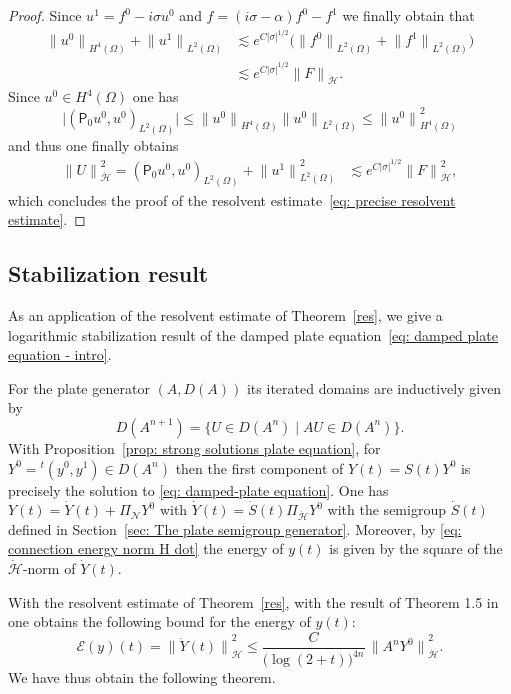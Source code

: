 \documentclass[10pt]{amsart}
\let\sep\mid
\theoremstyle{plain}
\theoremstyle{definition}
\newcommand{\inp}[2]{(#1, #2)}
\renewcommand{\H}{{\mathcal H}}
\newcommand{\E}{\ensuremath{\mathcal E}}
\newcommand{\transp}{\ensuremath{\phantom{}^{t}}}
\newcommand{\Norm}[2]{{\| #1 \|}_{#2}}
\newcommand{\Pell}{\mathsf P_0}
\begin{document}
\begin{proof}
Since $u^1=f^0-i\sigma u^0$ and $f=(i\sigma-\alpha)f^0-f^1$ we finally obtain that
\begin{align*}
\Norm{u^0}{H^4(\Omega)}
+\Norm{u^1}{L^2(\Omega)}
&\lesssim e^{C|\sigma|^{1/2}}
\big(\Norm{f^0}{L^2(\Omega)}+\Norm{f^1}{L^2(\Omega)}\big) \\
&\lesssim e^{C|\sigma|^{1/2}} \Norm{F}{\dot \H}.
\end{align*}
Since $u^0 \in H^4(\Omega)$ one has
\begin{equation*}
\big|\inp{\Pell u^0}{u^0}_{L^2(\Omega)}\big|
\leq \Norm{u^0}{H^4(\Omega)}\Norm{u^0}{L^2(\Omega)}
\leq \Norm{u^0}{H^4(\Omega)}^2
\end{equation*}
and thus one finally obtains
\begin{align*}
\Norm{U}{\dot \H}^2 = \inp{\Pell u^0}{u^0}_{L^2(\Omega)}
+\Norm{u^1}{L^2(\Omega)}^2
&\lesssim e^{C|\sigma|^{1/2}} \Norm{F}{\dot \H}^2,
\end{align*}
which concludes the proof of the resolvent estimate~\eqref{eq: precise resolvent estimate}.
\end{proof}

\subsection{Stabilization result}
\label{sec: Stabilization result}
As an application of the resolvent estimate of
Theorem~\ref{res}, we give a logarithmic stabilization result of the damped
plate equation~\eqref{eq: damped plate equation - intro}.

For the plate generator $(A,D(A))$ its iterated domains are
inductively given by
\begin{equation*}
D(A^{n+1}) = \{ U \in D(A^n)\sep A U \in D(A^n)\}.
\end{equation*}
With Proposition~\ref{prop: strong solutions plate equation}, for $Y^0 =\transp(y^0,y^1) \in D(A^n)$ then the first
component of $Y(t) = S(t) Y^0$ is precisely the solution to \eqref{eq:
damped-plate equation}.
One has $Y(t) = \dot{Y}(t) + \Pi_{\mathcal N} Y^0$ with $\dot{Y}(t)
=\dot{S}(t) \Pi_{\dot{\H}} Y^0$ with the semigroup $\dot{S}(t)$
defined in Section~\ref{sec: The plate semigroup generator}. Moreover,
by \eqref{eq: connection energy norm H dot} the energy of $y(t)$ is
given by the square of the $\dot{\H}$-norm of $\dot{Y}(t)$.

With the resolvent estimate of Theorem~\ref{res}, with the result of
Theorem 1.5 in \cite{BD} one obtains the following bound for the
energy of $y(t)$:
\begin{equation}
\label{eq: logarithmic energy decay}
\E(y)(t) = \Norm{\dot{Y} (t) }{\dot{\H}}^2
\leq \frac{C}{\big(\log(2+t)\big)^{4 n}}\,
\Norm{A^n Y^0}{\dot{\H}}^2.
\end{equation}
We have thus obtain the following theorem.
\end{document}
